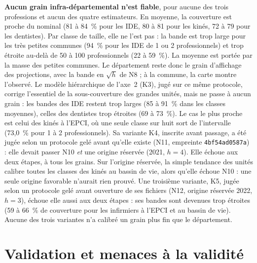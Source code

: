 \textbf{Aucun grain infra-départemental n'est fiable}, pour aucune des trois professions et aucun des
quatre estimateurs. En moyenne, la couverture est proche du nominal (81 à 84\mesure{}~\% pour les IDE,
80 à 81 pour les kinés, 72 à 79 pour les dentistes). Par classe de taille, elle ne l'est pas : la bande
est trop large pour les très petites communes (94\mesure{}~\% pour les IDE de 1 ou 2
professionnels) et trop étroite au-delà de 50 à 100 professionnels (22 à 59\mesure{}~\%). La moyenne
est portée par la masse des petites communes. Le département reste donc le grain d'affichage des
projections, avec la bande en $\sqrt h$ de N8 ; à la commune, la carte montre l'observé. Le modèle
hiérarchique de l'axe~2 (K3), jugé sur ce même protocole, corrige l'essentiel de la sous-couverture
des grandes unités, mais ne passe à aucun grain : les bandes des IDE restent trop larges (85 à
91\mesure{}~\% dans les classes moyennes), celles des dentistes trop étroites (69 à 73\mesure{}~\%).
Le cas le plus proche est celui des kinés à l'EPCI, où une seule classe sur huit sort de l'intervalle
(73,0\mesure{}~\% pour 1 à 2 professionnels). Sa variante K4, inscrite avant passage, a été jugée selon un protocole gelé avant
qu'elle existe (N11, empreinte \texttt{4bf54ad0587a}) : elle devait passer N10 \emph{et} une origine
réservée (2021, $h = 4$). Elle échoue aux deux étapes, à tous les grains. Sur l'origine réservée, la simple
tendance des unités calibre toutes les classes des kinés au bassin de vie, alors qu'elle échoue N10 :
une seule origine favorable n'aurait rien prouvé. Une troisième variante, K5, jugée selon un protocole gelé avant ouverture de ses fichiers (N12,
origine réservée 2022, $h = 3$), échoue elle aussi aux deux étapes : ses bandes sont devenues trop
étroites (59 à 66\mesure{}~\% de couverture pour les infirmiers à l'EPCI et au bassin de vie). Aucune des
trois variantes n'a calibré un grain plus fin que le département.

\section{Validation et menaces à la validité}\label{a3-sec:menaces}
